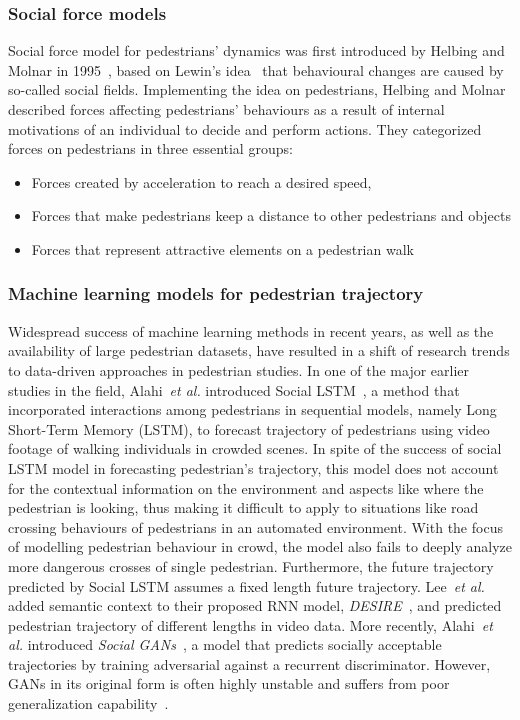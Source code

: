 \subsubsection{Social force models}
Social force model for pedestrians’ dynamics was first introduced by Helbing and Molnar in 1995~\cite{helbing1995social}, based on Lewin’s idea~\cite{lewin1951field} that behavioural changes are caused by so-called social fields. Implementing the idea on pedestrians, Helbing and Molnar described forces affecting pedestrians’ behaviours as a result of internal motivations of an individual to decide and perform actions. They categorized forces on pedestrians in three essential groups:
\begin{itemize}
    \item Forces created by acceleration to reach a desired speed,
    \item Forces that make pedestrians keep a distance to other pedestrians and objects
    \item Forces that represent attractive elements on a pedestrian walk
\end{itemize}

\subsubsection{Machine learning models for pedestrian trajectory}
Widespread success of machine learning methods in recent years, as well as the availability of large pedestrian datasets, have resulted in a shift of research trends to data-driven approaches in pedestrian studies. In one of the major earlier studies in the field, Alahi~\textit{et al.} introduced Social LSTM~\cite{alahi2016social}, a method that incorporated interactions among pedestrians in sequential models, namely Long Short-Term Memory (LSTM), to forecast trajectory of pedestrians using video footage of walking individuals in crowded scenes. In spite of the success of social LSTM model in forecasting pedestrian's trajectory, this model does not account for the contextual information on the environment and aspects like where the pedestrian is looking, thus making it difficult to apply to situations like road crossing behaviours of pedestrians in an automated environment. With the focus of modelling pedestrian behaviour in crowd, the model also fails to deeply analyze more dangerous crosses of single pedestrian. Furthermore, the future trajectory predicted by Social LSTM assumes a fixed length future trajectory. Lee~\textit{et al.} added semantic context to their proposed RNN model, \textit{DESIRE}~\cite{lee2017desire}, and predicted pedestrian trajectory of different lengths in video data. More recently, Alahi~\textit{et al.} introduced \textit{Social GANs}~\cite{gupta2018social}, a model that predicts socially acceptable trajectories by training adversarial against a recurrent discriminator. However, GANs in its original form is often highly unstable and suffers from poor generalization capability~\cite{thanh2019improving}.

